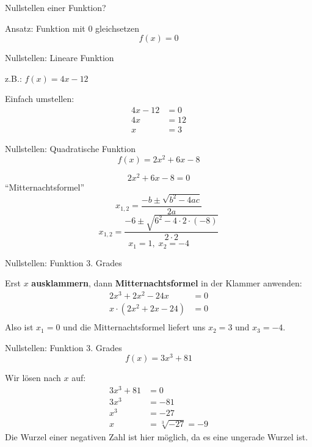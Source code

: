 \documentclass[paper=a6,ngerman,twoside=true,fontsize=14pt, parskip = half]{scrartcl}
\begin{document}
\begin{frage}
	Nullstellen einer Funktion?
	
\end{frage}
\begin{antwort}
	Ansatz: Funktion mit 0 gleichsetzen
	\[
	f(x)=0
	\]
\end{antwort}
\begin{frage}
	Nullstellen: Lineare Funktion
		
	z.B.: $f(x)=4x-12$
		
\end{frage}
\begin{antwort}
	Einfach umstellen:
	\begin{align*}
	4x-12&=0 \\
	4x&=12 \\
	x&=3
	\end{align*}
\end{antwort}
\begin{frage}
	Nullstellen: Quadratische Funktion
	\[
		f(x)=2x^2+6x-8
	\]
\end{frage}
\begin{antwort}
		\[
		2x^2+6x-8=0
		\]
	"`Mitternachtsformel"'
	\[
		x_{1,2}=\frac{-b\pm\sqrt{b^2-4ac}}{2a}
	\]
	\[
	x_{1,2}=\frac{-6\pm\sqrt{6^2-4\cdot2\cdot(-8)}}{2\cdot2 }
	\]
	\[
	x_{1}=1,\;x_{2}=-4
	\]

\end{antwort}
\begin{frage}
	Nullstellen: Funktion 3. Grades
\end{frage}
\begin{antwort}
	Erst $x$ \textbf{ausklammern}, dann \textbf{Mitternachtsformel} in 
			der Klammer anwenden:
	\normalsize\begin{align*}
		2x^3+2x^2-24x&=0\\
		x\cdot(2x^2+2x-24)&=0\\
	\end{align*}	
	Also ist $x_1 = 0$ und die Mitternachtsformel
	liefert uns $x_2 = 3$ und $x_3 = -4.$
\end{antwort}
\begin{frage}
	Nullstellen: Funktion 3. Grades
	\[
	f(x)=3x^3+81
	\]
\end{frage}
\begin{antwort}
	Wir lösen nach $x$ auf:
	\begin{align*}
		3x^3+81&=0 \\
		3x^3&=-81 \\
		x^3&=-27 \\
		x&=\sqrt[3]{-27}=-9
	\end{align*}
	\footnotesize \color{gray}
	Die Wurzel einer negativen Zahl ist hier möglich, da es eine ungerade Wurzel ist.
\end{antwort}
\end{document}
